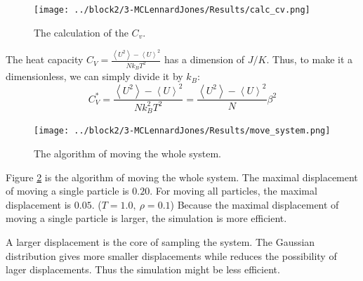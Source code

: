 \documentclass{assignmeownt}
\begin{document}
\begin{figure}
    \centering
    \texttt{[image: ../block2/3-MCLennardJones/Results/calc\_cv.png]}
    \caption{The calculation of the $C_v$.}
    \label{fig:calc_cv}
\end{figure}


The heat capacity $C_V=\frac{\left<U^2\right>-\left<U\right>^2}{Nk_BT^2}$ has a dimension of $J/K$. Thus, to make it a dimensionless, we can simply divide it by $k_B$:
$$C_V^*=\frac{\left<U^2\right>-\left<U\right>^2}{Nk_B^2T^2}=\frac{\left<U^2\right>-\left<U\right>^2}{N}\beta^2$$

\begin{figure}
    \centering
    \texttt{[image: ../block2/3-MCLennardJones/Results/move\_system.png]}
    \caption{The algorithm of moving the whole system.}
    \label{fig:move_system}
\end{figure}

Figure \ref{fig:move_system} is the algorithm of moving the whole system. The maximal displacement of moving a single particle is $0.20$. For moving all particles, the maximal displacement is $0.05$. ($T=1.0,\ \rho=0.1$) Because the maximal displacement of moving a single particle is larger, the simulation is more efficient.

A larger displacement is the core of sampling the system. The Gaussian distribution gives more smaller displacements while reduces the possibility of lager displacements. Thus the simulation might be less efficient.

\bigskip

\end{document}
